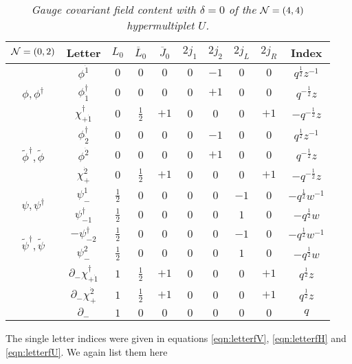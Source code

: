 \documentclass[main.tex]{subfiles}
\begin{document}
\begin{table}
\centering
 \begin{tabular}{|c|c|c|c|c|c|c|c|c|c|} 
 \hline
$\mathcal{N}=(0,2)$&Letter &$L_0$& $\overline{L}_0$& $\overline{J}_0$ &$2j_1$&$2j_2$& $2j_L$&$2j_R$ & Index\\\hline
\hline
\multirow{ 3}{*}{$\phi,\phi^{\dagger}$}&$\phi^{\dot1}$ &$0$ & $0$& $0$&$0$&$-1$&$0$&$0$ & $q^{\frac{1}{2}}z^{-1}$\\\cline{2-10}
&$\phi^{\dagger}_{\dot1}$&$0$ &$0$ & $0$&$0$&$+1$& $0$ & $0$&$q^{-\frac{1}{2}}z$\\\cline{2-10}
&$\chi^{\dagger}_{+\dot1}$ &$0$&$\frac{1}{2}$ & $+1$ &$0$&$0$& $0$ &$+1$& $-q^{-\frac{1}{2}}z$\\\hline
\multirow{ 3}{*}{$\tilde{\phi}^{\dagger},\tilde{\phi}$}&$\phi^{\dagger}_{\dot2}$ &$0$&$0$ & $0$&$0$&$-1$& $0$&$0$ & $q^{\frac{1}{2}}z^{-1}$\\\cline{2-10}
&$\phi^{\dot2}$ &$0$&$0$ & $0$& $0$&$+1$&$0$ &$0$& $q^{-\frac{1}{2}}z$\\\cline{2-10}
&$\chi_{+}^{\dot2}$&$0$ &$\frac{1}{2}$ & $+1$ &$0$&$0$& $0$& $+1$&$-q^{-\frac{1}{2}}z$\\\hline
\multirow{ 2}{*}{$\psi,\psi^{\dagger}$}&$\psi_{-}^{1}$ &$\frac{1}{2}$&$0$ & $0$ &$0$&$0$& $-1$ &$0$& $-q^{\frac{1}{2}}w^{-1}$\\\cline{2-10}
&$\psi^{\dagger}_{-1}$&$\frac{1}{2}$ &$0$ & $0$&$0$&$0$ & $1$ &$0$& $-q^{\frac{1}{2}}w$\\\hline
\multirow{ 2}{*}{$\tilde{\psi}^{\dagger},\tilde{\psi}$}&$-\psi^{\dagger}_{-2}$&$\frac{1}{2}$ &$0$ & $0$&$0$&$0$ & $-1$ &$0$& $-q^{\frac{1}{2}}w^{-1}$\\\cline{2-10}
&$\psi_{-}^{2}$ &$\frac{1}{2}$&$0$ & $0$ &$0$&$0$& $1$ &$0$& $-q^{\frac{1}{2}}w$\\\hline
\hline
\multirow{ 2}{*}{}&$\partial_-\chi^{\dagger}_{+\dot1}$ &$1$&$\frac{1}{2}$ & $+1$ &$0$&$0$& $0$&$+1$& $q^{\frac{1}{2}}z$\\\cline{2-10}
&$\partial_-\chi_{+}^{\dot2}$&$1$ &$\frac{1}{2}$ & $+1$ &$0$&$0$& $0$&$+1$& $q^{\frac{1}{2}}z$\\\hline
\hline
&$\partial_{-}$&$1$ &$0$ &$0$& $0$&$0$&$0$ &$0$& $q$\\\hline
\end{tabular}
\caption{\it Gauge covariant field content with $\delta=0$ of the $\mathcal{N}=(4,4)$ hypermultiplet $U$.}
 \label{tab:Uletters}
\end{table}
\renewcommand{\arraystretch}{1}
The single letter indices were given in equations \eqref{eqn:letterfV}, \eqref{eqn:letterfH} and \eqref{eqn:letterfU}. We again list them here
\end{document}

